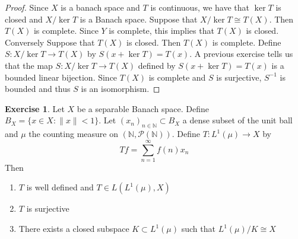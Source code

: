 \documentclass[12pt]{amsart}
\theoremstyle{definition}
\newtheorem{ex}[definition]{Exercise}
\newcommand{\N}{\mathbb{N}}
\newcommand{\MP}{\mathcal{P}}
\DeclareMathOperator*{\0}{\mbf{0}}
\DeclareMathOperator*{\1}{\mbf{1}}
\newcommand{\lex}[1]{\label{ex:#1}}
\begin{document}
	\begin{proof}
		Since $X$ is a banach space and $T$ is continuous, we have that $\ker T$ is closed and $X/ \ker T$ is a Banach space. Suppose that $X/ \ker T \cong T(X)$. Then $T(X)$ is complete. Since $Y$ is complete, this implies that $T(X)$ is closed. \\
		Conversely Suppose that $T(X)$ is closed. Then $T(X)$ is complete. Define $S: X/ \ker T \rightarrow T(X)$ by $S(x + \ker T) = T(x)$. A previous exercise tells us that the map $S: X/ \ker T \rightarrow T(X)$ defined by $S(x + \ker T) = T(x)$ is a bounded linear bijection. Since $T(X)$ is complete and $S$ is surjective, $S^{-1}$ is bounded and thus $S$ is an isomorphism.   
	\end{proof}
	
	\begin{ex} \lex{}
		Let $X$ be a separable Banach space. Define $B_X = \{x \in X: \|x \|< 1\}$. Let $(x_n)_{n \in \N} \subset B_X $ a dense subset of the unit ball and $\mu$ the counting measure on $(\N, \MP(\N))$. Define $T: L^1(\mu) \rightarrow X$ by $$Tf = \sum_{n=1}^{\infty}f(n)x_n$$ Then 
		\begin{enumerate}
			\item $T$ is well defined and $T \in L(L^1(\mu), X)$
			\item $T$ is surjective
			\item There exists a closed subspace $K \subset L^1(\mu)$ such that $L^1(\mu)/K \cong X$ 
		\end{enumerate} 
	\end{ex}
	
\end{document}
